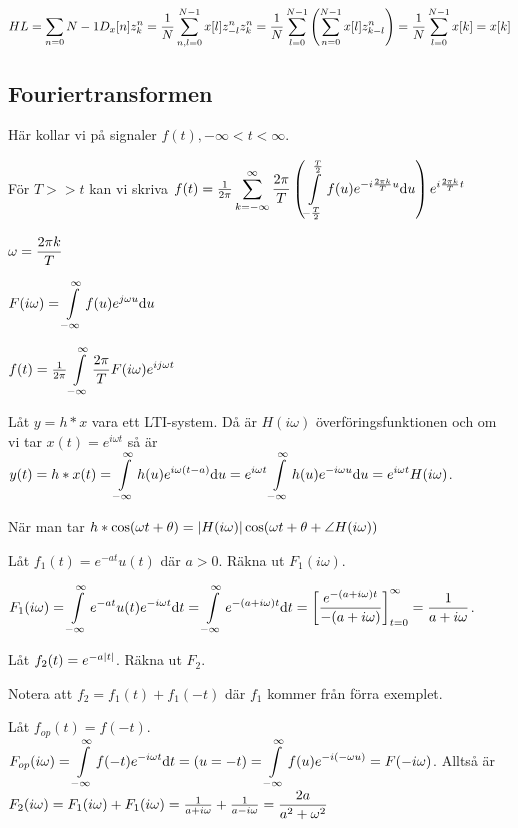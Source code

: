 \documentclass[a4paper]{article}
\begin{document}
\(
    HL = \displaystyle\sum_{n=0}{N-1} D_x[n] z_k^n = \frac{1}{N}\displaystyle\sum_{n,l=0}^{N-1} x[l] z_{-l}^n z_k^n
    = \frac{1}{N}\displaystyle\sum_{l=0}^{N-1}\left(\displaystyle\sum_{n=0}^{N-1} x[l] z_{k-l}^n\right)
    = \frac{1}{N}\displaystyle\sum_{l=0}^{N-1}x[k] = x[k]
\) 

\subsection{Fouriertransformen}
Här kollar vi på signaler \(
    f(t), -\infty < t < \infty
\).

För \(
    T >> t
\) kan vi skriva \(
    f(t) = \frac{1}{2\pi}\displaystyle\sum_{k=-\infty}^\infty \displaystyle\frac{2\pi}{T} \left(\displaystyle\int\limits_{-\frac{T}{2} } ^{\frac{T}{2} } f(u) e^{-i \frac{2\pi k}{T}u} \dd u \right) e^{i \frac{2\pi k}{T}t}
\) 

\(
    \omega = \displaystyle\frac{2\pi k}{T} 
\) 

\begin{defn}[Fouriertransformen]
    \(
        F(i\omega) = \displaystyle\int\limits_{-\infty}^{\infty} f(u) e^{j\omega u} \dd u
    \) 
\end{defn}

\begin{sats}
    \(
        f(t) = \frac{1}{2\pi}\displaystyle\int\limits_{-\infty}^\infty \displaystyle\frac{2\pi}{T} F(i\omega) e^{i j\omega t}
    \) 
\end{sats}

Låt \(
    y = h * x
\) vara ett LTI-system. Då är \(
    H(i\omega) 
\) överföringsfunktionen och om vi tar \(
    x(t) = e^{i\omega t}
\) så är \(
    y (t) = h * x(t) = \displaystyle\int\limits_{-\infty}^{\infty} h(u) e^{i\omega (t-a)} \dd u 
    = e^{i\omega t} \displaystyle\int\limits_{-\infty}^{\infty} h(u) e^{-i\omega u} \dd u
    = e^{i\omega t}H(i\omega)
\). 

När man tar \(
    h * \cos(\omega t + \theta) = \abs{H(i \omega)} \cos(\omega t + \theta + \angle H(i\omega))
\) 


\begin{ex}
    Låt \(
        f_1(t) = e^{-at}u(t)
    \) där \(
        a > 0
    \). Räkna ut \(
        F_1(i\omega)
    \).

    \(
        F_1(i\omega) = \displaystyle\int\limits_{-\infty}^{\infty} e^{-at} u(t) e^{-i\omega t} \dd t 
        = \displaystyle\int\limits_{-\infty}^{\infty} e^{-(a+i\omega)t} \dd t
        = \left[\displaystyle\frac{e^{-(a+i\omega)t}}{-(a+i\omega)} \right]_{t=0}^\infty 
        = \frac{1}{a+i\omega}
    \).
\end{ex}

\begin{ex}
    Låt \(
        f_2(t) = e^{-a\abs{t}}
    \). Räkna ut \(
        F_2
    \).

    Notera att \(
        f_2 = f_1(t) + f_1(-t)
    \) där \(
        f_1
    \) kommer från förra exemplet.

    Låt \(
        f_{op}(t) = f(-t)
    \). \(
        F_{op}(i\omega) = \displaystyle\int\limits_{-\infty}^{\infty} f(-t) e^{-i\omega t} \dd t
        = (u = -t) = \displaystyle\int\limits_{-\infty}^{\infty} f(u) e^{-i(-\omega u)} = F(-i\omega)
    \). Alltså är \(
        F_2(i\omega) = F_1(i\omega) + F_1(i\omega) = \frac{1}{a+i\omega} + \frac{1}{a-i\omega} = \displaystyle\frac{2a}{a^2+\omega^2} 
    \) 
\end{ex}
\end{document}
